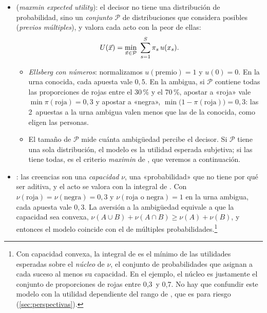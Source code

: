 \documentclass[11pt]{article}
\begin{document}
\begin{itemize}
\item {} (\emph{maxmin expected utility})\nocite{GilboaSchmeidler1989Maxmin}: el decisor no tiene una distribución de probabilidad, sino un \emph{conjunto} $\mathcal{P}$ de distribuciones que considera posibles (\emph{previos múltiples}), y valora cada acto con la peor de ellas:
  \begin{equation}\label{eq:maxmin}
  U(\vect{x})=\min_{\vect{\pi}\in\mathcal{P}}\ \sum_{s=1}^{S}\pi_s\,u(x_s) .
  \end{equation}
  \begin{itemize}
  \item \emph{Ellsberg con números}: normalizamos $u(\text{premio})=1$ y $u(0)=0$. En la urna conocida, cada apuesta vale $0{,}5$. En la ambigua, si $\mathcal{P}$ contiene todas las proporciones de rojas entre el 30\,\% y el 70\,\%, apostar a «roja» vale $\min\pi(\text{roja})=0{,}3$ y apostar a «negra», $\min\big(1-\pi(\text{roja})\big)=0{,}3$: las 2~apuestas a la urna ambigua valen menos que las de la conocida, como eligen las personas.
  \item El tamaño de $\mathcal{P}$ mide cuánta ambigüedad percibe el decisor. Si $\mathcal{P}$ tiene una sola distribución, el modelo es la utilidad esperada subjetiva; si las tiene todas, es el criterio \emph{maximin} de , que veremos a continuación.
  \end{itemize}
\item {}\nocite{Schmeidler1989Subjective}: las creencias son una \emph{capacidad} $\nu$, una «probabilidad» que no tiene por qué ser aditiva, y el acto se valora con la integral de . Con $\nu(\text{roja})=\nu(\text{negra})=0{,}3$ y $\nu(\text{roja o negra})=1$ en la urna ambigua, cada apuesta vale $0{,}3$. La aversión a la ambigüedad equivale a que la capacidad sea convexa, $\nu(A\cup B)+\nu(A\cap B)\geq\nu(A)+\nu(B)$, y entonces el modelo coincide con el de múltiples probabilidades.\footnote{Con capacidad convexa, la integral de  es el mínimo de las utilidades esperadas sobre el \emph{núcleo} de $\nu$, el conjunto de probabilidades que asignan a cada suceso al menos su capacidad\nocite{Schmeidler1989Subjective}. En el ejemplo, el núcleo es justamente el conjunto de proporciones de rojas entre 0,3~y 0,7. No hay que confundir este modelo con la utilidad dependiente del rango de \textcite{Quiggin1982Theory}, que es para riesgo (\ref{sec:perspectivas}).}

\end{itemize}
\end{document}

